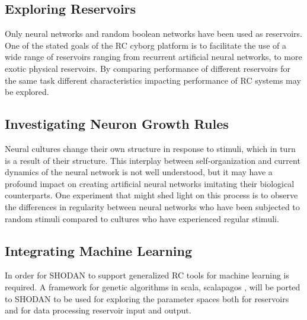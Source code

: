 \subsection{Exploring Reservoirs}
Only neural networks and random boolean networks have been used as reservoirs.
One of the stated goals of the RC cyborg platform is to facilitate the use of a
wide range of reservoirs ranging from recurrent artificial neural networks, to
more exotic physical reservoirs.
By comparing performance of different reservoirs for the same task different
characteristics impacting performance of RC systems may be explored.
\subsection{Investigating Neuron Growth Rules}
Neural cultures change their own structure in response to stimuli, which in turn
is a result of their structure.
This interplay between self-organization and current dynamics of the neural
network is not well understood, but it may have a profound impact on creating
artificial neural networks imitating their biological counterparts.
One experiment that might shed light on this process is to observe the
differences in regularity between neural networks who have been subjected to
random stimuli compared to cultures who have experienced regular stimuli.
\subsection{Integrating Machine Learning}
In order for SHODAN to support generalized RC tools for machine learning is
required.
A framework for genetic algorithms in scala, scalapagos
\cite{scalapagos}, will be ported to SHODAN
to be used for exploring the parameter spaces both for
reservoirs and for data processing reservoir input and output.
